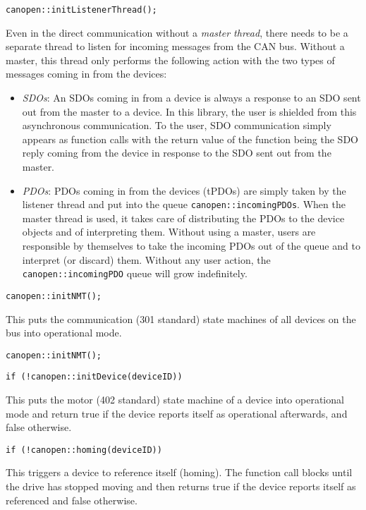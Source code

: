 \begin{verbatim}
canopen::initListenerThread();
\end{verbatim}
Even in the direct communication without a {\em master thread}, there needs to be a separate thread to listen for incoming messages from the CAN bus. Without a master, this thread only performs the following action with the two types of messages coming in from the devices:
\begin{itemize}
\item {\em SDOs}: An SDOs coming in from a device is always a response to an SDO sent out from the master to a device. In this library, the user is shielded from this asynchronous communication. To the user, SDO communication simply appears as function calls with the return value of the function being the SDO reply coming from the device in response to the SDO sent out from the master. 
\item {\em PDOs}: PDOs coming in from the devices (tPDOs) are simply taken by the listener thread and put into the queue \texttt{canopen::incomingPDOs}. When the master thread is used, it takes care of distributing the PDOs to the device objects and of interpreting them. Without using a master, users are responsible by themselves to take the incoming PDOs out of the queue and to interpret (or discard) them. Without any user action, the \texttt{canopen::incomingPDO} queue will grow indefinitely.
\end{itemize}

\begin{verbatim}
canopen::initNMT();
\end{verbatim}
This puts the communication (301 standard) state machines of all devices on the bus into operational mode.

\begin{verbatim}
canopen::initNMT();
\end{verbatim}

\begin{verbatim}
if (!canopen::initDevice(deviceID))
\end{verbatim}
This puts the motor (402 standard) state machine of a device into operational mode and return true if the device reports itself as operational afterwards, and false otherwise.

\begin{verbatim}
if (!canopen::homing(deviceID))
\end{verbatim}
This triggers a device to reference itself (homing). The function call blocks until the drive has stopped moving and then returns true if the device reports itself as referenced and false otherwise.

